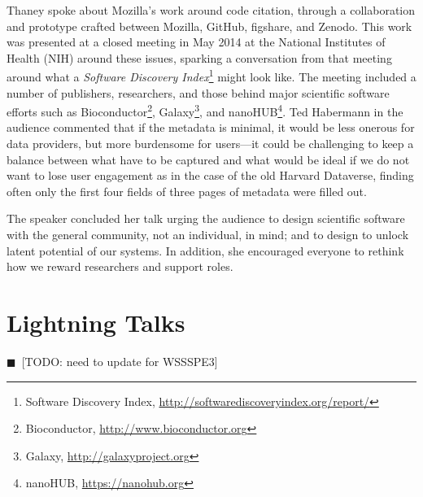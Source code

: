 \documentclass[11pt, oneside]{amsart}
\newcommand{\todo}[1]{{\color{blue}$\blacksquare$~\textsf{[TODO: #1]}}}
\newcommand{\note}[1]{ {\textcolor{blueish}    { ***Note:      #1 }}}
\begin{document}
Thaney spoke about Mozilla's work around code citation, through a collaboration
and prototype crafted between Mozilla, GitHub, figshare, and Zenodo. This work
was presented at a closed meeting in May 2014 at the National Institutes of
Health (NIH) around these issues, sparking a conversation from that meeting
around what a \emph{Software Discovery
Index}\footnote{Software Discovery Index, \url{http://softwarediscoveryindex.org/report/}} might look
like. The meeting included a number of publishers, researchers, and those behind
major scientific software efforts such as
Bioconductor\footnote{Bioconductor, \url{http://www.bioconductor.org}},
Galaxy\footnote{Galaxy, \url{http://galaxyproject.org}}, and
nanoHUB\footnote{nanoHUB, \url{https://nanohub.org}}.
Ted Habermann in the audience commented that if the metadata is minimal, it
would be less onerous for data providers, but more burdensome for users---it
could be challenging to keep a balance between what have to be captured and what
would be ideal if we do not want to lose user engagement as in the case of the
old Harvard Dataverse, finding often only the first four fields of three pages
of metadata were filled out.

The speaker concluded her talk urging the audience to design scientific software
with the general community, not an individual, in mind; and to design to unlock
latent potential of our systems. In addition, she encouraged everyone to rethink
how we reward researchers and support roles.



\section{Lightning Talks} \label{sec:lightning}
\todo{need to update for WSSSPE3}
\begin{comment}
\note{
\href{http://wssspe.researchcomputing.org.uk/wssspe3/agenda/}{Slides.}}
\end{comment}
\end{document}
